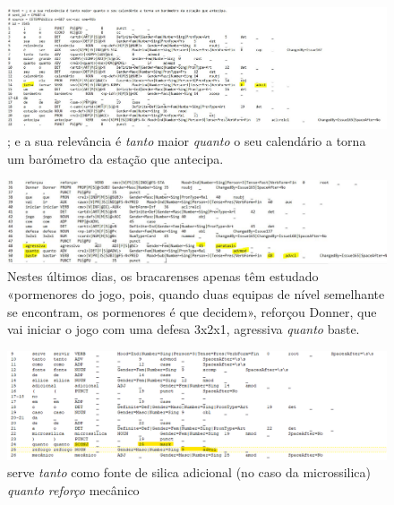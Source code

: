 \documentclass[output=paper,colorlinks,citecolor=brown]{langscibook}
\begin{document}
	\begin{figure}
	    \centering
	    \includegraphics[width=\textwidth,height=\textheight,keepaspectratio]{imagesDrive/image13.png}
	    \caption{; e a sua relevância é \emph{tanto} maior \emph{quanto} o seu calendário a torna um barómetro da estação que antecipa.}
	    \label{fig:comparative13}
	\end{figure}{}

	\begin{figure}
	    \centering
	    \includegraphics[width=\textwidth,height=\textheight,keepaspectratio]{imagesDrive/image5.png}
	    \caption{Nestes últimos dias, os bracarenses apenas têm estudado «pormenores do jogo, pois, quando duas equipas de nível semelhante se encontram, os pormenores é que decidem», reforçou Donner, que vai iniciar o jogo com uma defesa 3x2x1, agressiva \emph{quanto} baste.}
	    \label{fig:comparative14}
	\end{figure}{}

	\begin{figure}
	    \centering
	    \includegraphics[width=\textwidth,height=\textheight,keepaspectratio]{imagesDrive/tantoquanto.png}
	    \caption{serve \emph{tanto} como fonte de silica adicional (no caso da microssilica)\emph{ quanto reforço} mecânico}
	    \label{fig:tantoquanto}
	\end{figure}{}
\end{document}

